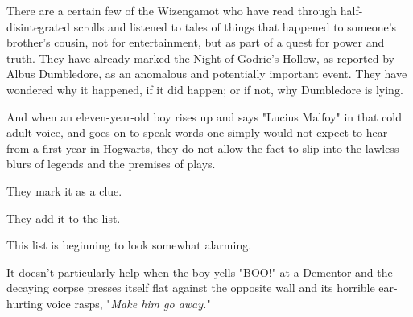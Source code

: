 There are a certain few of the Wizengamot who have read through 
half-disintegrated scrolls and listened to tales of things that happened to 
someone's brother's cousin, not for entertainment, but as part of a quest for 
power and truth. They have already marked the Night of Godric's Hollow, as 
reported by Albus Dumbledore, as an anomalous and potentially important event. 
They have wondered why it happened, if it did happen; or if not, why Dumbledore 
is lying.

And when an eleven-year-old boy rises up and says "Lucius Malfoy" in that cold 
adult voice, and goes on to speak words one simply would not expect to hear 
from a first-year in Hogwarts, they do not allow the fact to slip into the 
lawless blurs of legends and the premises of plays.

They mark it as a clue.

They add it to the list.

This list is beginning to look somewhat alarming.

It doesn't particularly help when the boy yells "BOO!" at a Dementor and the 
decaying corpse presses itself flat against the opposite wall and its horrible 
ear-hurting voice rasps, "\emph{Make him go away.}"